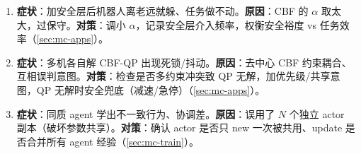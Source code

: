 \begin{enumerate}
  \item \textbf{症状}：加安全层后机器人离老远就躲、任务做不动。\textbf{原因}：CBF 的 $\alpha$ 取太大，过保守。\textbf{对策}：调小 $\alpha$，记录安全层介入频率，权衡安全裕度 vs 任务效率（\cref{sec:mc-apps}）。
  \item \textbf{症状}：多机各自解 CBF-QP 出现死锁/抖动。\textbf{原因}：去中心 CBF 约束耦合、互相误判意图。\textbf{对策}：检查是否多约束冲突致 QP 无解，加优先级/共享意图，QP 无解时安全兜底（减速/急停）（\cref{sec:mc-apps}）。
  \item \textbf{症状}：同质 agent 学出不一致行为、协调差。\textbf{原因}：误用了 $N$ 个独立 actor 副本（破坏参数共享）。\textbf{对策}：确认 actor 是否只 new 一次被共用、update 是否合并所有 agent 经验（\cref{sec:mc-train}）。
\end{enumerate}
